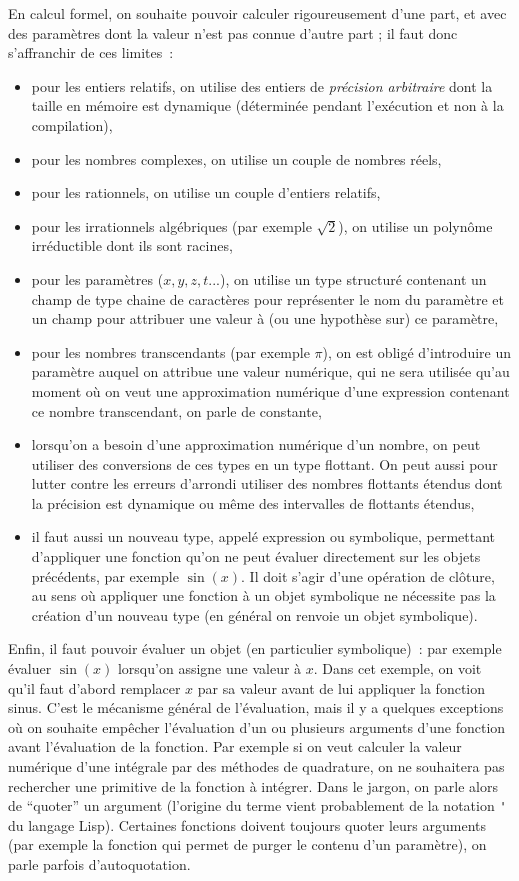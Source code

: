 \documentclass[a4paper,11pt]{book}
\begin{document}
\begin{giacjshere}
En calcul formel, on souhaite pouvoir calculer rigoureusement d'une part, 
et avec des param\`etres dont la valeur n'est 
pas connue d'autre part ; il faut donc s'affranchir de ces limites~: 
\begin{itemize}
\item pour les entiers relatifs, on utilise des entiers de 
{\em précision arbitraire}
dont la taille en mémoire est dynamique (déterminée pendant l'exécution et non
à la compilation),
\item pour les nombres complexes, on utilise un couple de nombres réels,
\item pour les rationnels, on utilise un couple d'entiers relatifs,
\item pour les irrationnels algébriques (par exemple $\sqrt{2}$), 
on utilise un polyn\^ome irréductible dont ils sont racines,
\item pour les param\`etres ($x,y,z,t...$), on utilise un type 
structuré contenant un champ de type chaine de caract\`eres pour 
repr\'esenter le nom du param\`etre et
un champ pour attribuer une valeur à (ou une hypoth\`ese sur) ce param\`etre,
\item pour les nombres transcendants (par exemple $\pi$), on est obligé
d'introduire un paramètre auquel on attribue une valeur numérique, 
qui ne sera utilisée qu'au moment où on veut une 
approximation numérique d'une expression contenant ce nombre transcendant,
on parle de constante,
\item lorsqu'on a besoin d'une approximation numérique d'un nombre,
on peut utiliser des conversions de ces types en un type flottant. On peut 
aussi pour lutter contre les erreurs 
d'arrondi utiliser des nombres flottants étendus dont la précision est 
dynamique ou même des intervalles de flottants étendus,
\item il faut aussi
un nouveau type, appelé expression ou symbolique, permettant d'appliquer
une fonction qu'on ne peut évaluer directement sur les objets pr\'ec\'edents,
par exemple $\sin(x)$. Il
doit s'agir d'une op\'eration de clôture, au sens où appliquer une fonction \`a
un objet symbolique ne nécessite pas la création d'un nouveau type
(en général on renvoie un objet symbolique).
\end{itemize}

Enfin, il faut pouvoir \'evaluer un objet (en particulier symbolique)~:
par exemple évaluer $\sin(x)$ lorsqu'on assigne une valeur \`a $x$. 
Dans cet exemple, on voit qu'il faut d'abord remplacer $x$ par
sa valeur avant de lui appliquer la fonction sinus. C'est le mécanisme
général de l'évaluation, mais il y a quelques exceptions où
on souhaite empêcher l'évaluation d'un ou plusieurs arguments
d'une fonction avant l'évaluation de la fonction. Par exemple si on 
veut calculer la valeur numérique d'une intégrale par des méthodes
de quadrature, on ne souhaitera pas rechercher une primitive de la 
fonction à intégrer. Dans le jargon, on parle alors de ``quoter'' un argument 
(l'origine du terme vient probablement de la notation \verb|'| du langage 
Lisp). Certaines fonctions doivent toujours quoter leurs arguments
(par exemple la fonction qui permet de purger le contenu d'un paramètre),
on parle parfois d'autoquotation.



\end{giacjshere}
\end{document}
